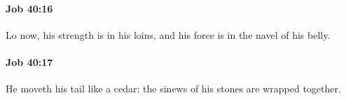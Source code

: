 		\paragraph{Job 40:16} %
			\label{JOB-40-16}

			Lo now, his strength is in his loins, and his force is in the navel of his belly.


		\paragraph{Job 40:17} %
			\label{JOB-40-17}

			He moveth his tail like a cedar: the sinews of his stones are wrapped together.


